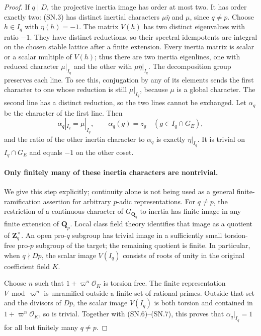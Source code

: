 \begin{proof}
If $q\mid D$, the projective inertia image has order at most two.
It has order exactly two: (SN.3) has distinct inertial characters
$\mu\bar\eta$ and $\mu$, since $q\ne p$.
Choose $h\in I_q$ with $\eta(h)=-1$.  The matrix $V(h)$ has two
distinct eigenvalues with ratio $-1$.  They have distinct
reductions, so their spectral idempotents are integral on the
chosen stable lattice after a finite extension.  Every inertia
matrix is scalar or a scalar multiple of $V(h)$; thus there are
two inertia eigenlines, one with reduced character $\mu|_{I_q}$
and the other with $\mu\bar\eta|_{I_q}$.
The decomposition group preserves each line.  To see this,
conjugation by any of its elements sends the first character to
one whose reduction is still $\mu|_{I_q}$, because $\mu$ is a
global character.  The second line has a distinct reduction, so
the two lines cannot be exchanged.
Let $\alpha_q$ be the character of the first line.  Then
\[
 \bar\alpha_q|_{I_q}=\mu|_{I_q},\qquad
 \alpha_q(g)=z_g\quad(g\in I_q\cap G_E),                 \tag{SN.7}
\]
and the ratio of the other inertia character to $\alpha_q$
is exactly $\eta|_{I_q}$.  It is trivial on $I_q\cap G_E$
and equals $-1$ on the other coset.

\paragraph{Only finitely many of these inertia characters are nontrivial.}
We give this step explicitly; continuity alone is not being used
as a general finite-ramification assertion for arbitrary
$p$-adic representations.  For $q\ne p$, the restriction of a
continuous character of $G_{\mathbf Q_q}$ to inertia has finite
image in any finite extension of $\mathbf Q_p$.
Local class field theory identifies that image as a quotient of
$\mathbf Z_q^{\times}$.  An open pro-$q$ subgroup has trivial
image in a sufficiently small torsion-free pro-$p$ subgroup of
the target; the remaining quotient is finite.
In particular, when $q\nmid Dp$, the scalar image $V(I_q)$
consists of roots of unity in the original coefficient field $K$.

Choose $n$ such that $1+\varpi^n\mathcal O_K$ is torsion free.
The finite representation $V\bmod\varpi^n$ is unramified
outside a finite set of rational primes.  Outside that set and
the divisors of $Dp$, the scalar image $V(I_q)$ is both torsion
and contained in $1+\varpi^n\mathcal O_K$, so is trivial.
Together with (SN.6)--(SN.7), this proves that
$\alpha_q|_{I_q}=1$ for all but finitely many $q\ne p$.


\end{proof}
